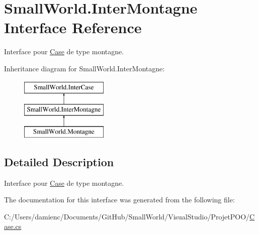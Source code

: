 \hypertarget{interface_small_world_1_1_inter_montagne}{\section{Small\-World.\-Inter\-Montagne Interface Reference}
\label{interface_small_world_1_1_inter_montagne}
}


Interface pour \hyperlink{class_small_world_1_1_case}{Case} de type montagne.  


Inheritance diagram for Small\-World.\-Inter\-Montagne\-:\begin{figure}[H]
\begin{center}
\leavevmode
\includegraphics[height=3.000000cm]{interface_small_world_1_1_inter_montagne}
\end{center}
\end{figure}


\subsection{Detailed Description}
Interface pour \hyperlink{class_small_world_1_1_case}{Case} de type montagne. 

The documentation for this interface was generated from the following file\-:\begin{DoxyCompactItemize}
\item 
C\-:/\-Users/damienc/\-Documents/\-Git\-Hub/\-Small\-World/\-Visual\-Studio/\-Projet\-P\-O\-O/\hyperlink{_case_8cs}{Case.\-cs}\end{DoxyCompactItemize}
